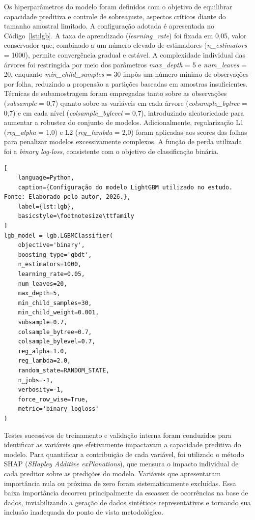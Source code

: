 \documentclass[12pt, a4paper]{report}
\theoremstyle{definition}
\theoremstyle{remark}
\theoremstyle{plain}
\begin{document}
Os hiperparâmetros do modelo foram definidos com o objetivo de equilibrar capacidade preditiva e controle de sobreajuste, aspectos críticos diante do tamanho amostral limitado. A configuração adotada é apresentada no Código~\ref{lst:lgb}. A taxa de aprendizado (\textit{learning\_rate}) foi fixada em 0,05, valor conservador que, combinado a um número elevado de estimadores (\textit{n\_estimators} = 1000), permite convergência gradual e estável. A complexidade individual das árvores foi restringida por meio dos parâmetros \textit{max\_depth} = 5 e \textit{num\_leaves} = 20, enquanto \textit{min\_child\_samples} = 30 impôs um número mínimo de observações por folha, reduzindo a propensão a partições baseadas em amostras insuficientes. Técnicas de subamostragem foram empregadas tanto sobre as observações (\textit{subsample} = 0,7) quanto sobre as variáveis em cada árvore (\textit{colsample\_bytree} = 0,7) e em cada nível (\textit{colsample\_bylevel} = 0,7), introduzindo aleatoriedade para aumentar a robustez do conjunto de modelos. Adicionalmente, regularização L1 (\textit{reg\_alpha} = 1,0) e L2 (\textit{reg\_lambda} = 2,0) foram aplicadas aos scores das folhas para penalizar modelos excessivamente complexos. A função de perda utilizada foi a \textit{binary log-loss}, consistente com o objetivo de classificação binária.

\begin{lstlisting}[
    language=Python,
    caption={Configuração do modelo LightGBM utilizado no estudo. Fonte: Elaborado pelo autor, 2026.},
    label={lst:lgb},
    basicstyle=\footnotesize\ttfamily
]
lgb_model = lgb.LGBMClassifier(
    objective='binary',
    boosting_type='gbdt',
    n_estimators=1000,
    learning_rate=0.05,
    num_leaves=20,
    max_depth=5,
    min_child_samples=30,
    min_child_weight=0.001,
    subsample=0.7,
    colsample_bytree=0.7,
    colsample_bylevel=0.7,
    reg_alpha=1.0,
    reg_lambda=2.0,
    random_state=RANDOM_STATE,
    n_jobs=-1,
    verbosity=-1,
    force_row_wise=True,
    metric='binary_logloss'
)
\end{lstlisting}

Testes sucessivos de treinamento e validação interna foram conduzidos para identificar as variáveis que efetivamente impactavam a capacidade preditiva do modelo. Para quantificar a contribuição de cada variável, foi utilizado o método SHAP (\textit{SHapley Additive exPlanations}), que mensura o impacto individual de cada preditor sobre as predições do modelo. Variáveis que apresentaram importância nula ou próxima de zero foram sistematicamente excluídas. Essa baixa importância decorreu principalmente da escassez de ocorrências na base de dados, inviabilizando a geração de dados sintéticos representativos e tornando sua inclusão inadequada do ponto de vista metodológico.
\end{document}

